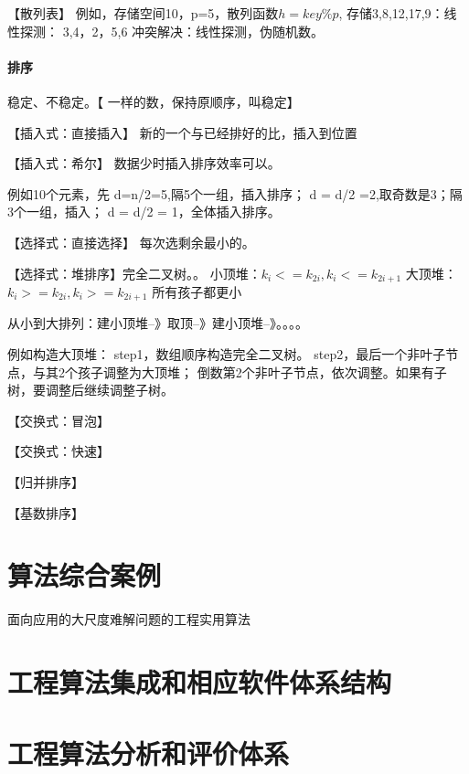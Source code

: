 \documentclass[UTF8]{../computerUniverse}
\begin{document}
【散列表】
例如，存储空间10，p=5，散列函数$h=key\%p$,
存储3,8,12,17,9：线性探测： 3,4，2，5,6
冲突解决：线性探测，伪随机数。

\subsubsection{排序}

稳定、不稳定。【 一样的数，保持原顺序，叫稳定】

【插入式：直接插入】
新的一个与已经排好的比，插入到位置

【插入式：希尔】
数据少时插入排序效率可以。

例如10个元素，先
d=n/2=5,隔5个一组，插入排序；
d = d/2  =2,取奇数是3；隔3个一组，插入；
d = d/2 = 1，全体插入排序。


【选择式：直接选择】
每次选剩余最小的。

【选择式：堆排序】完全二叉树。。
小顶堆：$k_i<=k_{2i}, k_i<=k_{2i+1}$
大顶堆：$k_i>=k_{2i}, k_i>=k_{2i+1}$ 所有孩子都更小

从小到大排列：建小顶堆--》取顶--》建小顶堆--》。。。。

例如构造大顶堆：
step1，数组顺序构造完全二叉树。
step2，最后一个非叶子节点，与其2个孩子调整为大顶堆；
       倒数第2个非叶子节点，依次调整。如果有子树，要调整后继续调整子树。
       




【交换式：冒泡】

【交换式：快速】



【归并排序】

【基数排序】




\chapter{算法综合案例}
面向应用的大尺度难解问题的工程实用算法


\chapter{工程算法集成和相应软件体系结构}

\chapter{工程算法分析和评价体系}
\end{document}
